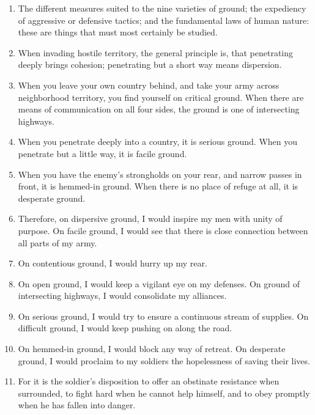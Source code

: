 \begin{enumerate}
  \item The different measures suited to the nine varieties of ground;
    the expediency of aggressive or defensive tactics; and the
    fundamental laws of human nature: these are things that must most
    certainly be studied.

  \item When invading hostile territory, the general principle is,
    that penetrating deeply brings cohesion; penetrating but a short
    way means dispersion.

  \item When you leave your own country behind, and take your army
    across neighborhood territory, you find yourself on critical
    ground. When there are means of communication on all four sides,
    the ground is one of intersecting highways.

  \item When you penetrate deeply into a country, it is serious
    ground. When you penetrate but a little way, it is facile ground.

  \item When you have the enemy's strongholds on your rear, and narrow
    passes in front, it is hemmed-in ground. When there is no place of
    refuge at all, it is desperate ground.

  \item Therefore, on dispersive ground, I would inspire my men with
    unity of purpose. On facile ground, I would see that there is
    close connection between all parts of my army.

  \item On contentious ground, I would hurry up my rear.

  \item On open ground, I would keep a vigilant eye on my defenses. On
    ground of intersecting highways, I would consolidate my alliances.

  \item On serious ground, I would try to ensure a continuous stream
    of supplies. On difficult ground, I would keep pushing on along
    the road.

  \item On hemmed-in ground, I would block any way of retreat. On
    desperate ground, I would proclaim to my soldiers the hopelessness
    of saving their lives.

  \item For it is the soldier's disposition to offer an obstinate
    resistance when surrounded, to fight hard when he cannot help
    himself, and to obey promptly when he has fallen into danger.


\end{enumerate}
